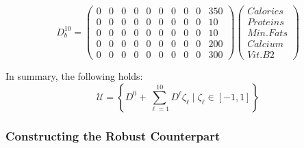 \documentclass[a4paper,12pt]{article}
\begin{document}
\[
D^{10}_{b} = \begin{pmatrix}
0 & 0 & 0 & 0 & 0 & 0 & 0 & 0 & 0 & 350 \\
0 & 0 & 0 & 0 & 0 & 0 & 0 & 0 & 0 & 10 \\
0 & 0 & 0 & 0 & 0 & 0 & 0 & 0 & 0 & 10 \\
0 & 0 & 0 & 0 & 0 & 0 & 0 & 0 & 0 & 200 \\
0 & 0 & 0 & 0 & 0 & 0 & 0 & 0 & 0 & 300 
\end{pmatrix}
\begin{pmatrix}
    Calories \\
    Proteins \\
    Min. Fats \\
    Calcium \\
    Vit. B2
\end{pmatrix}
\]

In summary, the following holds:
\[
\mathcal{U} = \left\{ D^0 + \sum_{\ell=1}^{10}D^{\ell} \zeta_{\ell} \;\vert\; \zeta_{\ell} \in [-1, 1] \right\}
\]

\subsubsection*{Constructing the Robust Counterpart}
\end{document}
